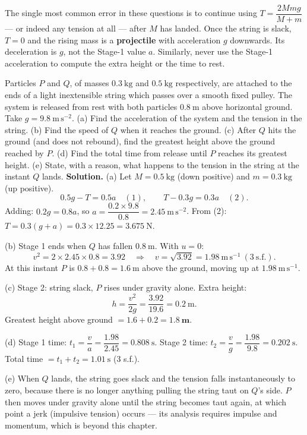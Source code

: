 \documentclass[11pt]{article}
\begin{document}
\begin{attention}
The single most common error in these questions is to continue using $T = \dfrac{2Mmg}{M+m}$ --- or indeed any tension at all --- after $M$ has landed. Once the string is slack, $T = 0$ and the rising mass is a \textbf{projectile} with acceleration $g$ downwards. Its deceleration is $g$, not the Stage-1 value $a$. Similarly, never use the Stage-1 acceleration to compute the extra height or the time to rest.
\end{attention}

\begin{exoresolu}
Particles $P$ and $Q$, of masses $0.3\ \mathrm{kg}$ and $0.5\ \mathrm{kg}$ respectively, are attached to the ends of a light inextensible string which passes over a smooth fixed pulley. The system is released from rest with both particles $0.8\ \mathrm{m}$ above horizontal ground. Take $g = 9.8\ \mathrm{m\,s^{-2}}$.
(a) Find the acceleration of the system and the tension in the string.
(b) Find the speed of $Q$ when it reaches the ground.
(c) After $Q$ hits the ground (and does not rebound), find the greatest height above the ground reached by $P$.
(d) Find the total time from release until $P$ reaches its greatest height.
(e) State, with a reason, what happens to the tension in the string at the instant $Q$ lands.
\tcblower
\textbf{Solution.} (a) Let $M = 0.5\ \mathrm{kg}$ (down positive) and $m = 0.3\ \mathrm{kg}$ (up positive).
\[ 0.5g - T = 0.5a \quad (1), \qquad T - 0.3g = 0.3a \quad (2). \]
Adding: $0.2g = 0.8a$, so $a = \dfrac{0.2 \times 9.8}{0.8} = 2.45\ \mathrm{m\,s^{-2}}$.
From (2): $T = 0.3(g + a) = 0.3 \times 12.25 = 3.675\ \mathrm{N}$.

(b) Stage 1 ends when $Q$ has fallen $0.8\ \mathrm{m}$. With $u = 0$:
\[ v^2 = 2 \times 2.45 \times 0.8 = 3.92 \quad\Longrightarrow\quad v = \sqrt{3.92} = 1.98\ \mathrm{m\,s^{-1}}\ (3\ \mathrm{s.f.}). \]
At this instant $P$ is $0.8 + 0.8 = 1.6\ \mathrm{m}$ above the ground, moving up at $1.98\ \mathrm{m\,s^{-1}}$.

(c) Stage 2: string slack, $P$ rises under gravity alone. Extra height:
\[ h = \frac{v^2}{2g} = \frac{3.92}{19.6} = 0.2\ \mathrm{m}. \]
Greatest height above ground $= 1.6 + 0.2 = \mathbf{1.8\ m}$.

(d) Stage 1 time: $t_1 = \dfrac{v}{a} = \dfrac{1.98}{2.45} = 0.808\ \mathrm{s}$.
Stage 2 time: $t_2 = \dfrac{v}{g} = \dfrac{1.98}{9.8} = 0.202\ \mathrm{s}$.
Total time $= t_1 + t_2 = 1.01\ \mathrm{s}$ (3 s.f.).

(e) When $Q$ lands, the string goes slack and the tension falls instantaneously to zero, because there is no longer anything pulling the string taut on $Q$'s side. $P$ then moves under gravity alone until the string becomes taut again, at which point a jerk (impulsive tension) occurs --- its analysis requires impulse and momentum, which is beyond this chapter.
\end{exoresolu}
\end{document}
